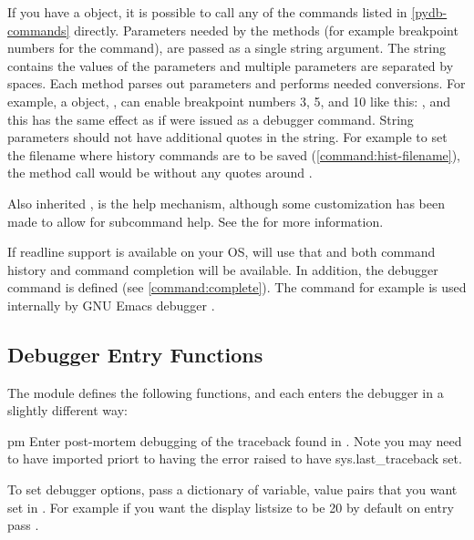 If you have a  object, it is possible to call any of the
commands listed in \ref{pydb-commands} directly. Parameters needed by
the methods (for example breakpoint numbers for the 
command), are passed as a single string argument. The string contains
the values of the parameters and multiple parameters are separated by
spaces. Each method parses out parameters and performs needed
conversions.  For example, a  object, , can enable
breakpoint numbers 3, 5, and 10 like this: , and this has the same effect as if  were
issued as a debugger command. String parameters should not have
additional quotes in the string. For example to set the filename where
history commands are to be saved (\ref{command:hist-filename}), the
method call would be  without any quotes around .

Also inherited , is the help mechanism, although some
customization has been made to allow for subcommand help.  See the
for more information.

If readline support is available on your OS,  will use that
and both command history and command completion will be available. In
addition, the debugger  command is defined (see
\ref{command:complete}). The  command for example is
used internally by GNU Emacs debugger .

\subsection{Debugger Entry Functions}

The  module defines the following functions, and each enters
the debugger in a slightly different way:

\begin{funcdesc}{pm}{}
Enter post-mortem debugging of the traceback found in
. Note you may need to have 
imported priort to having the error raised to have sys.last_traceback
set.

To set debugger options, pass a dictionary of variable, value pairs
that you want set in . For example if you want
the display listsize to be 20 by default on entry pass
.
\end{funcdesc}

